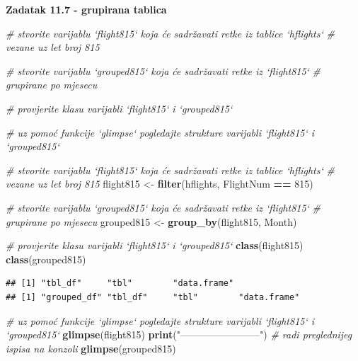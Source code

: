 \documentclass[]{book}
\newenvironment{Shaded}{\begin{snugshade}}{\end{snugshade}}
\newcommand{\KeywordTok}[1]{\textcolor[rgb]{0.13,0.29,0.53}{\textbf{#1}}}
\newcommand{\DecValTok}[1]{\textcolor[rgb]{0.00,0.00,0.81}{#1}}
\newcommand{\StringTok}[1]{\textcolor[rgb]{0.31,0.60,0.02}{#1}}
\newcommand{\CommentTok}[1]{\textcolor[rgb]{0.56,0.35,0.01}{\textit{#1}}}
\newcommand{\OperatorTok}[1]{\textcolor[rgb]{0.81,0.36,0.00}{\textbf{#1}}}
\newcommand{\NormalTok}[1]{#1}
\theoremstyle{definition}
\theoremstyle{definition}
\theoremstyle{definition}
\theoremstyle{remark}
\begin{document}
\textbf{Zadatak 11.7 - grupirana tablica}

\begin{Shaded}
\begin{Highlighting}[]
\CommentTok{# stvorite varijablu `flight815` koja će sadržavati retke iz tablice `hflights`}
\CommentTok{# vezane uz let broj 815}

\CommentTok{# stvorite varijablu `grouped815` koja će sadržavati retke iz `flight815`}
\CommentTok{# grupirane po mjesecu}

\CommentTok{# provjerite klasu varijabli `flight815` i `grouped815`}


\CommentTok{# uz pomoć funkcije `glimpse` pogledajte strukture varijabli `flight815` i `grouped815`}
\end{Highlighting}
\end{Shaded}

\begin{Shaded}
\begin{Highlighting}[]
\CommentTok{# stvorite varijablu `flight815` koja će sadržavati retke iz tablice `hflights`}
\CommentTok{# vezane uz let broj 815}
\NormalTok{flight815 <-}\StringTok{ }\KeywordTok{filter}\NormalTok{(hflights, FlightNum }\OperatorTok{==}\StringTok{ }\DecValTok{815}\NormalTok{) }

\CommentTok{# stvorite varijablu `grouped815` koja će sadržavati retke iz `flight815`}
\CommentTok{# grupirane po mjesecu}
\NormalTok{grouped815 <-}\StringTok{ }\KeywordTok{group_by}\NormalTok{(flight815, Month)}

\CommentTok{# provjerite klasu varijabli `flight815` i `grouped815`}
\KeywordTok{class}\NormalTok{(flight815)}
\KeywordTok{class}\NormalTok{(grouped815)}
\end{Highlighting}
\end{Shaded}

\begin{verbatim}
## [1] "tbl_df"     "tbl"        "data.frame"
## [1] "grouped_df" "tbl_df"     "tbl"        "data.frame"
\end{verbatim}

\begin{Shaded}
\begin{Highlighting}[]
\CommentTok{# uz pomoć funkcije `glimpse` pogledajte strukture varijabli `flight815` i `grouped815`}
\KeywordTok{glimpse}\NormalTok{(flight815)}
\KeywordTok{print}\NormalTok{(}\StringTok{"------------------------"}\NormalTok{)  }\CommentTok{# radi preglednijeg ispisa na konzoli}
\KeywordTok{glimpse}\NormalTok{(grouped815)}
\end{Highlighting}
\end{Shaded}
\end{document}

